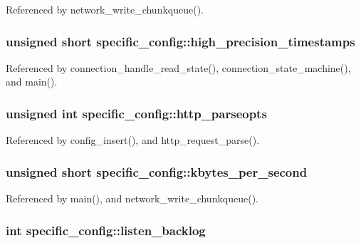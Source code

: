 Referenced by network\-\_\-write\-\_\-chunkqueue().

\hypertarget{structspecific__config_a9022a8482243c77301bdb64249951eed}{
\subsubsection[{high\-\_\-precision\-\_\-timestamps}]{\setlength{\rightskip}{0pt plus 5cm}unsigned short specific\-\_\-config\-::high\-\_\-precision\-\_\-timestamps}}\label{structspecific__config_a9022a8482243c77301bdb64249951eed}


Referenced by connection\-\_\-handle\-\_\-read\-\_\-state(), connection\-\_\-state\-\_\-machine(), and main().

\hypertarget{structspecific__config_a31d4946958587e46d6c5ded03943daf1}{
\subsubsection[{http\-\_\-parseopts}]{\setlength{\rightskip}{0pt plus 5cm}unsigned int specific\-\_\-config\-::http\-\_\-parseopts}}\label{structspecific__config_a31d4946958587e46d6c5ded03943daf1}


Referenced by config\-\_\-insert(), and http\-\_\-request\-\_\-parse().

\hypertarget{structspecific__config_a35cbf387c2c060b06622093e243c72df}{
\subsubsection[{kbytes\-\_\-per\-\_\-second}]{\setlength{\rightskip}{0pt plus 5cm}unsigned short specific\-\_\-config\-::kbytes\-\_\-per\-\_\-second}}\label{structspecific__config_a35cbf387c2c060b06622093e243c72df}


Referenced by main(), and network\-\_\-write\-\_\-chunkqueue().

\hypertarget{structspecific__config_ab326b0b3249b5ab1d599baa82742977a}{
\subsubsection[{listen\-\_\-backlog}]{\setlength{\rightskip}{0pt plus 5cm}int specific\-\_\-config\-::listen\-\_\-backlog}}\label{structspecific__config_ab326b0b3249b5ab1d599baa82742977a}


